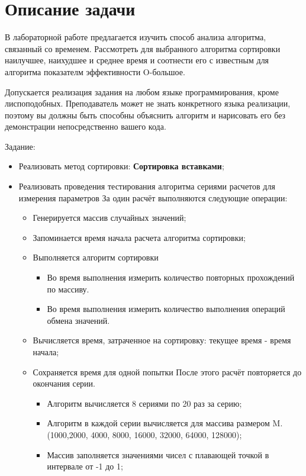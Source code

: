 \documentclass[12pt, a4paper]{report}
\begin{document}
	\section*{Описание задачи}
	\large
	В лабораторной работе предлагается изучить способ анализа алгоритма, связанный со временем. Рассмотреть для выбранного алгоритма сортировки наилучшее, наихудшее и среднее время и соотнести его с известным для алгоритма показателм эффективности O-большое. \par
	Допускается реализация задания на любом языке программирования, кроме лиспоподобных. Преподаватель может не знать конкретного языка реализации, поэтому вы должны быть способны объяснить алгоритм и нарисовать его без демонстрации непосредственно вашего кода. \par
	Задание:
	\begin{itemize}
		\item Реализовать метод сортировки: \textbf{Сортировка вставками};
		\item Реализовать проведения тестирования алгоритма сериями расчетов для измерения параметров За один расчёт выполняются следующие операции:
		\begin{itemize}
			\item Генерируется массив случайных значений;
			\item Запоминается время начала расчета алгоритма сортировки;
			\item Выполняется алгоритм сортировки
			\begin{itemize}
				\item Во время выполнения измерить количество повторных прохождений по массиву.
				\item Во время выполнения измерить количество выполнения операций обмена значений.
			\end{itemize}
			\item Вычисляется время, затраченное на сортировку: текущее время - время начала;
			\item Сохраняется время для одной попытки После этого расчёт повторяется до окончания серии.
			\begin{itemize}
				\item Алгоритм вычисляется 8 сериями по 20 раз за серию;
				\item Алгоритм в каждой серии вычисляется для массива размером M. (1000,2000, 4000, 8000, 16000, 32000, 64000, 128000);
				\item Массив заполняется значениями чисел с плавающей точкой в интервале от -1 до 1;

\end{itemize}
\end{itemize}
\end{itemize}
\end{document}
